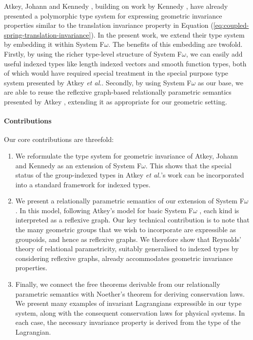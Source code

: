 \documentclass{sigplanconf}
\theoremstyle{examplestyle}
\begin{document}
Atkey, Johann and Kennedy \cite{atkey13abstraction}, building on
work by Kennedy \cite{kennedy97relational}, have already presented a
polymorphic type system for expressing geometric invariance properties
similar to the translation invariance property in Equation
(\ref{eq:coupled-spring-translation-invariance}). In the present work,
we extend their type system by embedding it within System
F$\omega$. The benefits of this embedding are twofold. Firstly, by
using the richer type-level structure of System F$\omega$, we can
easily add useful indexed types like length indexed vectors and smooth
function types, both of which would have required special treatment in
the special purpose type system presented by Atkey \emph{et
  al.}. Secondly, by using System F$\omega$ as our base, we are able
to reuse the reflexive graph-based relationally parametric semantics
presented by Atkey \cite{atkey12relational}, extending it as
appropriate for our geometric setting.

\paragraph{Contributions}

Our core contributions are threefold:
\begin{enumerate}
\item We reformulate the type system for geometric invariance of
  Atkey, Johann and Kennedy \cite{atkey13abstraction} as an extension
  of System F$\omega$. This shows that the special status of the
  group-indexed types in Atkey \emph{et al.}'s work can be
  incorporated into a standard framework for indexed types.
\item We present a relationally parametric semantics of our extension
  of System F$\omega$. In this model, following Atkey's model for
  basic System F$\omega$ \cite{atkey12relational}, each kind is
  interpreted as a reflexive graph. Our key technical contribution is
  to note that the many geometric groups that we wish to incorporate
  are expressible as groupoids, and hence as reflexive graphs. We
  therefore show that Reynolds' theory of relational parametricity,
  suitably generalised to indexed types by considering reflexive
  graphs, already accommodates geometric invariance properties.
\item Finally, we connect the free theorems derivable from our
  relationally parametric semantics with Noether's theorem for
  deriving conservation laws. We present many examples of invariant
  Lagrangians expressible in our type system, along with the
  consequent conservation laws for physical systems. In each case, the
  necessary invariance property is derived from the type of the
  Lagrangian.
\end{enumerate}
\end{document}
